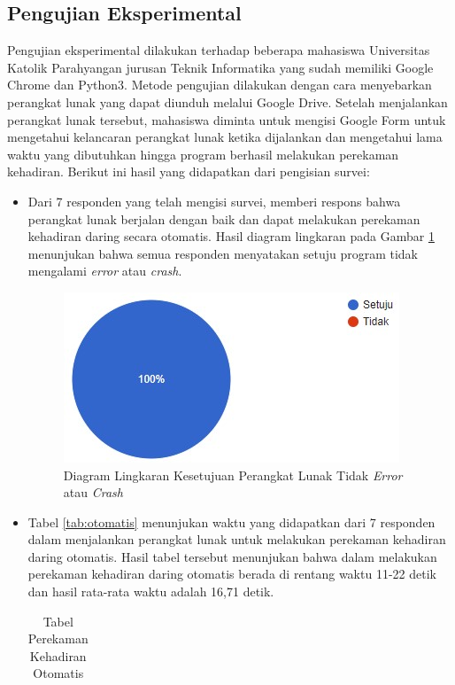 \subsection{Pengujian Eksperimental}
Pengujian eksperimental dilakukan terhadap beberapa mahasiswa Universitas Katolik Parahyangan jurusan Teknik Informatika yang sudah memiliki Google Chrome dan Python3. Metode pengujian dilakukan dengan cara menyebarkan perangkat lunak yang dapat diunduh melalui Google Drive. Setelah menjalankan perangkat lunak tersebut, mahasiswa diminta untuk mengisi Google Form untuk mengetahui kelancaran perangkat lunak ketika dijalankan dan mengetahui lama waktu yang dibutuhkan hingga program berhasil melakukan perekaman kehadiran. Berikut ini hasil yang didapatkan dari pengisian survei:
\begin{itemize}
	\item Dari 7 responden yang telah mengisi survei, memberi respons bahwa perangkat lunak berjalan dengan baik dan dapat melakukan perekaman kehadiran daring secara otomatis. Hasil diagram lingkaran pada Gambar \ref{fig:noerror} menunjukan bahwa semua responden menyatakan setuju program tidak mengalami \textit{error} atau \textit{crash}.
	\begin{figure}[H]
		\centering
		\includegraphics[scale=0.7]{Gambar/diagramLingkaran.jpg}
		\caption{Diagram Lingkaran Kesetujuan Perangkat Lunak Tidak \textit{Error} atau \textit{Crash}} 
		\label{fig:noerror}
	\end{figure}
	\item Tabel \ref{tab:otomatis} menunjukan waktu yang didapatkan dari 7 responden dalam menjalankan perangkat lunak untuk melakukan perekaman kehadiran daring otomatis. Hasil tabel tersebut menunjukan bahwa dalam melakukan perekaman kehadiran daring otomatis berada di rentang waktu 11-22 detik dan hasil rata-rata waktu adalah 16,71 detik.
	\begin{table}[ht]			
		\caption{Tabel Perekaman Kehadiran Otomatis}
		\centering
		\begin{tabular}{|p{3.5cm} |p{7cm}|}

\end{tabular}
\end{table}
\end{itemize}
